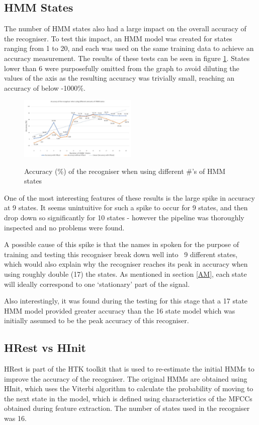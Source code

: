 \documentclass[journal]{IEEEtran}
\begin{document}
	\subsection{HMM States}
	The number of HMM states also had a large impact on the overall accuracy of the recogniser. To test this impact, an HMM model was created for states ranging from 1 to 20, and each was used on the same training data to achieve an accuracy measurement. The results of these tests can be seen in figure \ref{fig:eval_hmm}. States lower than 6 were purposefully omitted from the graph to avoid diluting the values of the axis as the resulting accuracy was trivially small, reaching an accuracy of below -1000\%.

	\begin{figure}[H]
		\centering
		\captionsetup{justification=centering}
		\includegraphics[width=0.5\textwidth]{eval_hmm.jpg}\\
		\caption{Accuracy (\%) of the recogniser when using different \#'s of HMM states}\label{fig:eval_hmm}
	\end{figure}

	
	
	One of the most interesting features of these results is the large spike in accuracy at 9 states. It seems unintuitive for such a spike to occur for 9 states, and then drop down so significantly for 10 states - however the pipeline was thoroughly inspected and no problems were found. 
	
	A possible cause of this spike is that the names in spoken for the purpose of training and testing this recogniser break down well into ~9 different states, which would also explain why the recogniser reaches its peak in accuracy when using roughly double (17) the states. As mentioned in section \ref{AM}, each state will ideally correspond to one `stationary' part of the signal.
	
	Also interestingly, it was found during the testing for this stage that a 17 state HMM model provided greater accuracy than the 16 state model which was initially assumed to be the peak accuracy of this recogniser.

	\subsection{HRest vs HInit}
	HRest is part of the HTK toolkit that is used to re-estimate the initial HMMs to improve the accuracy of the recogniser. The original HMMs are obtained using HInit, which uses the Viterbi algorithm to calculate the probability of moving to the next state in the model, which is defined using characteristics of the MFCCs obtained during feature extraction. The number of states used in the recogniser was 16.
	
\end{document}
